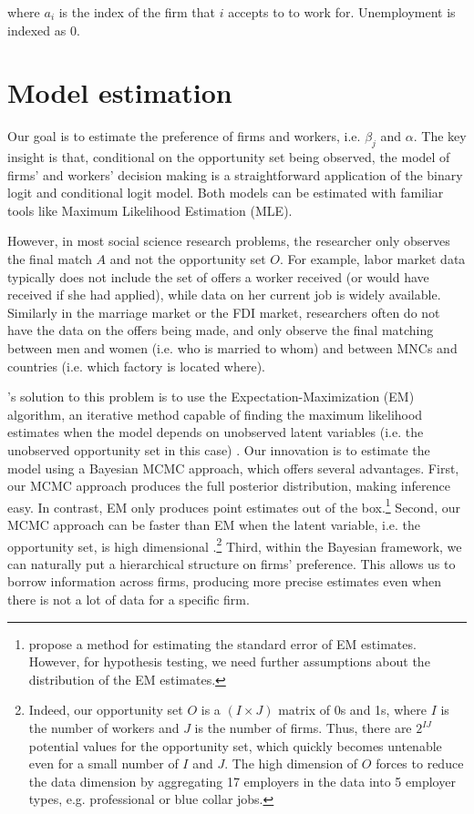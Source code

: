 where $a_i$ is the index of the firm that $i$ accepts to to work for.
Unemployment is indexed as 0.

\section{Model estimation}

Our goal is to estimate the preference of firms and workers, i.e. $\beta_j$ and
$\alpha$. The key insight is that, conditional on the opportunity set being
observed, the model of firms' and workers' decision making is a straightforward
application of the binary logit and conditional logit model. Both models can be
estimated with familiar tools like Maximum Likelihood Estimation (MLE).

However, in most social science research problems, the researcher only observes
the final match $A$ and not the opportunity set $O$. For example, labor market
data typically does not include the set of offers a worker received (or would
have received if she had applied), while data on her current job is widely
available. Similarly in the marriage market or the FDI market, researchers often
do not have the data on the offers being made, and only observe the final
matching between men and women (i.e. who is married to whom) and between MNCs
and countries (i.e. which factory is located where).

\citet{Logan1998}'s solution to this problem is to use the
Expectation-Maximization (EM) algorithm, an iterative method capable of finding
the maximum likelihood estimates when the model depends on unobserved latent
variables (i.e. the unobserved opportunity set in this case)
\citep{Dempster1977}. Our innovation is to estimate the model using a Bayesian
MCMC approach, which offers several advantages. First, our MCMC approach
produces the full posterior distribution, making inference easy. In contrast, EM
only produces point estimates out of the box.\footnote{\citet{Jamshidian2000}
  propose a method for estimating the standard error of EM estimates. However,
  for hypothesis testing, we need further assumptions about the distribution of
  the EM estimates.} Second, our MCMC approach can be faster than EM when the
latent variable, i.e. the opportunity set, is high dimensional
\citep{Ryden2008}.\footnote{Indeed, our opportunity set $O$ is a $(I \times J)$
  matrix of 0s and 1s, where $I$ is the number of workers and $J$ is the number
  of firms. Thus, there are $2^{IJ}$ potential values for the opportunity set,
  which quickly becomes untenable even for a small number of $I$ and $J$. The
  high dimension of $O$ forces \citet{Logan1998} to reduce the data dimension by
  aggregating 17 employers in the data into 5 employer types, e.g. professional
  or blue collar jobs.} Third, within the Bayesian framework, we can naturally
put a hierarchical structure on firms' preference. This allows us to borrow
information across firms, producing more precise estimates even when there is
not a lot of data for a specific firm.

